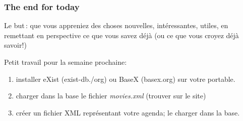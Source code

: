 \begin{frame}
\frametitle{The end for today}

Le but\,: que vous appreniez des choses nouvelles, intéressantes, utiles, en
remettant en perspective ce que vous savez déjà (ou ce que vous croyez déjà
savoir!)

\vfill

Petit travail pour la semaine prochaine:

\begin{enumerate}
   \item installer eXist (exist-db./org) ou BaseX (basex.org) sur votre portable.
   \item charger dans la base le fichier \textit{movies.xml} (trouver sur le site)
    \item créer un fichier XML représentant votre agenda; le charger dans la base.
\end{enumerate}
\end{frame}




